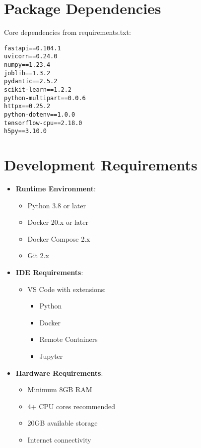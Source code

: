 \documentclass[12pt,a4paper]{report}
\begin{document}
\section{Package Dependencies}
Core dependencies from requirements.txt:

\begin{lstlisting}[language=text]
fastapi==0.104.1
uvicorn==0.24.0
numpy==1.23.4
joblib==1.3.2
pydantic==2.5.2
scikit-learn==1.2.2
python-multipart==0.0.6
httpx==0.25.2
python-dotenv==1.0.0
tensorflow-cpu==2.18.0
h5py==3.10.0
\end{lstlisting}

\section{Development Requirements}
\begin{itemize}
    \item \textbf{Runtime Environment}:
    \begin{itemize}
        \item Python 3.8 or later
        \item Docker 20.x or later
        \item Docker Compose 2.x
        \item Git 2.x
    \end{itemize}
    
    \item \textbf{IDE Requirements}:
    \begin{itemize}
        \item VS Code with extensions:
        \begin{itemize}
            \item Python
            \item Docker
            \item Remote Containers

            \item Jupyter
        \end{itemize}
    \end{itemize}
    
    \item \textbf{Hardware Requirements}:
    \begin{itemize}
        \item Minimum 8GB RAM
        \item 4+ CPU cores recommended
        \item 20GB available storage
        \item Internet connectivity
    \end{itemize}
\end{itemize}
\end{document}
